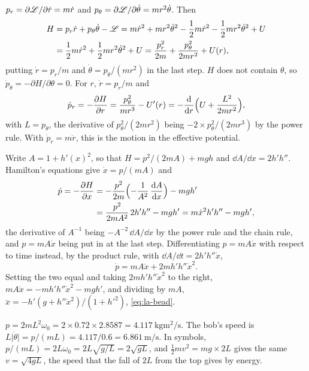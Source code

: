 $p_r = \partial\mathscr{L}/\partial\dot{r} = m\dot{r}$
and $p_\theta = \partial\mathscr{L}/\partial\dot\theta = mr^2\dot\theta$. Then
\begin{align*}
   H &= p_r\dot{r} + p_\theta\dot\theta - \mathscr{L}
   = m\dot{r}^2 + mr^2\dot\theta^2 - \frac12 m\dot{r}^2
   - \frac12 mr^2\dot\theta^2 + U\\
   &= \frac12 m\dot{r}^2 + \frac12 mr^2\dot\theta^2 + U
   = \frac{p_r^2}{2m} + \frac{p_\theta^2}{2mr^2} + U(r) ,
\end{align*}
putting $\dot{r} = p_r/m$ and $\dot\theta = p_\theta/(mr^2)$ in the last
step. $H$ does not contain $\theta$, so $\dot{p}_\theta = -\partial H/
\partial\theta = 0$. For $r$, $\dot{r} = p_r/m$ and
\begin{equation*}
   \dot{p}_r = -\frac{\partial H}{\partial r}
   = \frac{p_\theta^2}{mr^3} - U'(r)
   = -\frac{\mathrm{d}}{\mathrm{d} r}\Bigl(U + \frac{L^2}{2mr^2}\Bigr) ,
\end{equation*}
with $L = p_\theta$, the derivative of $p_\theta^2/(2mr^2)$ being $-2
\times p_\theta^2/(2mr^3)$ by the power rule. With $\dot{p}_r = m\ddot{r}$,
this is the motion in the effective potential.

Write $A = 1 + h'(x)^2$, so that $H = p^2/(2mA) +
mgh$ and $\dd A/\dd x = 2h'h''$. Hamilton's equations give $\dot{x} = p/(mA)$ and
\begin{align*}
   \dot{p} = -\frac{\partial H}{\partial x}
   &= -\frac{p^2}{2m}\Bigl(-\frac{1}{A^2}\,\frac{\mathrm{d} A}{\mathrm{d} x}\Bigr) - mgh'\\
   &= \frac{p^2}{2mA^2}\,2h'h'' - mgh' = m\dot{x}^2h'h'' - mgh' ,
\end{align*}
the derivative of $A^{-1}$ being $-A^{-2}\,\dd A/\dd x$ by the power rule
and the chain rule, and $p = mA\dot{x}$ being put in at the last step. Differentiating $p =
mA\dot{x}$ with respect to time instead, by the product rule, with $\dd A/\dd t = 2h'h''\dot{x}$,
\begin{equation*}
   \dot{p} = mA\ddot{x} + 2mh'h''\dot{x}^2 .
\end{equation*}
Setting the two equal and taking $2mh'h''\dot{x}^2$ to the right,
$mA\ddot{x} = -mh'h''\dot{x}^2 - mgh'$, and dividing by $mA$,
$\ddot{x} = -h'(g + h''\dot{x}^2)/(1 + h'^2)$, \cref{eq:la-bead}.

$p = 2mL^2\omega_0 = 2\times0.72\times2.8587 =
\SI{4.117}{\kilogram\metre\squared\per\second}$. The bob's speed is
$L\lvert\dot\theta\rvert = p/(mL) = 4.117/0.6 =
\SI{6.861}{\metre\per\second}$. In symbols, $p/(mL) = 2L\omega_0 = 2L\sqrt{g/L} = 2\sqrt{gL}$, and
$\frac12 mv^2 = mg\times2L$ gives the same $v = \sqrt{4gL}$, the speed
that the fall of $2L$ from the top gives by energy.

